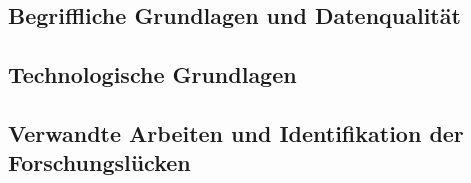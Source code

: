 \subsection{Begriffliche Grundlagen und Datenqualität}

\subsection{Technologische Grundlagen}

\subsection{Verwandte Arbeiten und Identifikation der Forschungslücken}